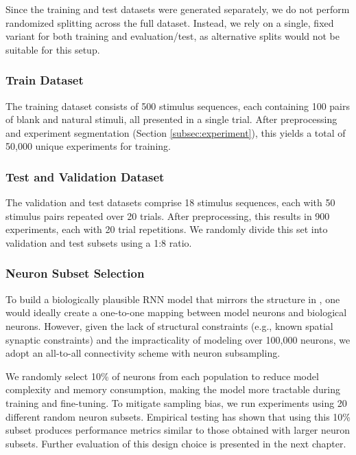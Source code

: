 Since the training and test datasets were generated separately, we do not perform randomized splitting across the full dataset. Instead, we rely on a single, fixed variant for both training and evaluation/test, as alternative splits would not be suitable for this setup.

\subsubsection{Train Dataset}
\label{subsubsec:train_dataset}

The training dataset consists of 500 stimulus sequences, each containing 100 pairs of blank and natural stimuli, all presented in a single trial. After preprocessing and experiment segmentation (Section \ref{subsec:experiment}), this yields a total of 50,000 unique experiments for training.

\subsubsection{Test and Validation Dataset}
\label{subsubsec:test_dataset}

The validation and test datasets comprise 18 stimulus sequences, each with 50 stimulus pairs repeated over 20 trials. After preprocessing, this results in 900 experiments, each with 20 trial repetitions. We randomly divide this set into validation and test subsets using a 1:8 ratio.

\subsubsection{Neuron Subset Selection}
\label{subsubsec:subset_selection}

To build a biologically plausible RNN model that mirrors the structure in \citet{antolik2024comprehensive}, one would ideally create a one-to-one mapping between model neurons and biological neurons. However, given the lack of structural constraints (e.g., known spatial synaptic constraints) and the impracticality of modeling over 100,000 neurons, we adopt an all-to-all connectivity scheme with neuron subsampling.

We randomly select 10\% of neurons from each population to reduce model complexity and memory consumption, making the model more tractable during training and fine-tuning. To mitigate sampling bias, we run experiments using 20 different random neuron subsets. Empirical testing has shown that using this 10\% subset produces performance metrics similar to those obtained with larger neuron subsets. Further evaluation of this design choice is presented in the next chapter.

